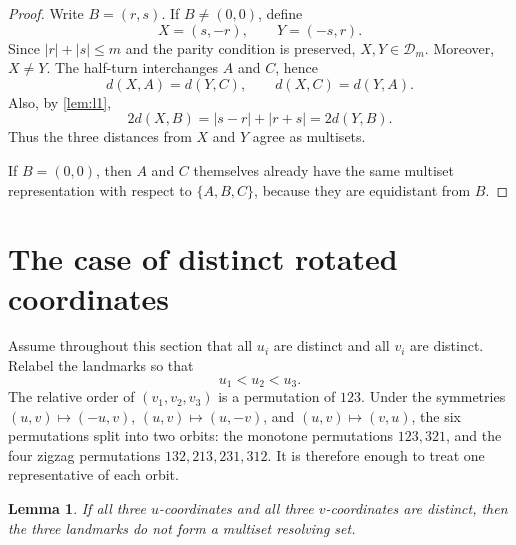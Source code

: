 \documentclass[11pt]{amsart}
\newtheorem{lemma}[lemma]{Lemma}
\theoremstyle{remark}
\newcommand{\dist}{d}
\newcommand{\D}{\mathcal D}
\begin{document}
\begin{proof}
Write $B=(r,s)$.  If $B\ne(0,0)$, define
\[
 X=(s,-r),
 \qquad
 Y=(-s,r).
\]
Since $|r|+|s|\le m$ and the parity condition is preserved, $X,Y\in\D_m$.  Moreover, $X\ne Y$.  The half-turn interchanges $A$ and $C$, hence
\[
 \dist(X,A)=\dist(Y,C),
 \qquad
 \dist(X,C)=\dist(Y,A).
\]
Also, by \cref{lem:l1},
\[
 2\dist(X,B)=|s-r|+|r+s|=2\dist(Y,B).
\]
Thus the three distances from $X$ and $Y$ agree as multisets.

If $B=(0,0)$, then $A$ and $C$ themselves already have the same multiset representation with respect to $\{A,B,C\}$, because they are equidistant from $B$.
\end{proof}

\section{The case of distinct rotated coordinates}\label{sec:distinct}

Assume throughout this section that all $u_i$ are distinct and all $v_i$ are distinct.  Relabel the landmarks so that
\[
 u_1<u_2<u_3.
\]
The relative order of $(v_1,v_2,v_3)$ is a permutation of $123$.  Under the symmetries $(u,v)\mapsto(-u,v)$, $(u,v)\mapsto(u,-v)$, and $(u,v)\mapsto(v,u)$, the six permutations split into two orbits: the monotone permutations $123,321$, and the four zigzag permutations $132,213,231,312$.  It is therefore enough to treat one representative of each orbit.

\begin{lemma}\label{lem:distinct}
If all three $u$-coordinates and all three $v$-coordinates are distinct, then the three landmarks do not form a multiset resolving set.
\end{lemma}
\end{document}
